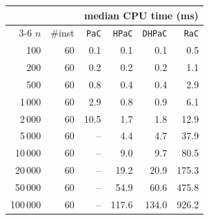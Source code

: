 \begin{tabular}{@{}rrrrrr@{}}
\toprule
 &  & \multicolumn{4}{c}{median CPU time (ms)} \\
\cmidrule(l){3-6}
$n$ & \#inst & \texttt{PaC} & \texttt{HPaC} & \texttt{DHPaC} & \texttt{RaC} \\
\midrule
100 & 60 & 0.1 & 0.1 & 0.1 & 0.5 \\
200 & 60 & 0.2 & 0.2 & 0.2 & 1.1 \\
500 & 60 & 0.8 & 0.4 & 0.4 & 2.9 \\
1\,000 & 60 & 2.9 & 0.8 & 0.9 & 6.1 \\
2\,000 & 60 & 10.5 & 1.7 & 1.8 & 12.9 \\
5\,000 & 60 & -- & 4.4 & 4.7 & 37.9 \\
10\,000 & 60 & -- & 9.0 & 9.7 & 80.5 \\
20\,000 & 60 & -- & 19.2 & 20.9 & 175.3 \\
50\,000 & 60 & -- & 54.9 & 60.6 & 475.8 \\
100\,000 & 60 & -- & 117.6 & 134.0 & 926.2 \\
\bottomrule
\end{tabular}
